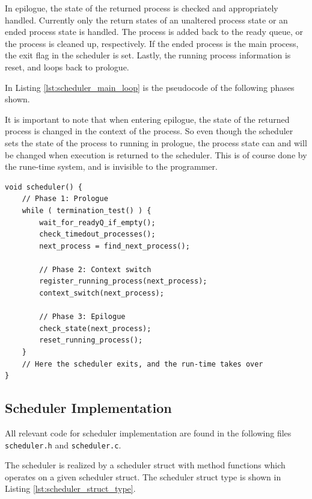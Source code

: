 In epilogue, the state of the returned process is checked and appropriately handled. Currently only the return states of an unaltered process state or an ended process state is handled. The process is added back to the ready queue, or the process is cleaned up, respectively. If the ended process is the main process, the exit flag in the scheduler is set. Lastly, the running process information is reset, and loops back to prologue.

In Listing \ref{lst:scheduler_main_loop} is the pseudocode of the following phases shown.

It is important to note that when entering epilogue, the state of the returned process is chan\-ged in the context of the process. So even though the scheduler sets the state of the process to running in prologue, the process state can and will be changed when execution is returned to the scheduler. This is of course done by the rune\hyp{}time system, and is invisible to the programmer.

\noindent\begin{minipage}{\textwidth}
\begin{lstlisting}[style=CustomC,caption={Pseudocode for scheduler main loop},label={lst:scheduler_main_loop}]
void scheduler() {
    // Phase 1: Prologue
    while ( termination_test() ) {
        wait_for_readyQ_if_empty();
        check_timedout_processes();
        next_process = find_next_process();
        
        // Phase 2: Context switch
        register_running_process(next_process);
        context_switch(next_process);
        
        // Phase 3: Epilogue
        check_state(next_process);
        reset_running_process();      
    }
    // Here the scheduler exits, and the run-time takes over
}
\end{lstlisting}
\end{minipage}


\subsection{Scheduler Implementation}

All relevant code for scheduler implementation are found in the following files \texttt{scheduler.h} and \texttt{scheduler.c}.

The scheduler is realized by a scheduler struct with method functions which operates on a given scheduler struct. The scheduler struct type is shown in Listing \ref{lst:scheduler_struct_type}.

